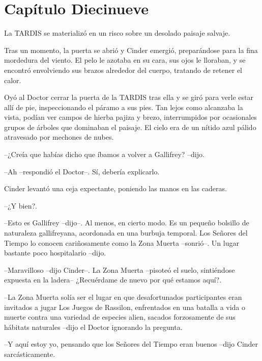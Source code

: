 \chapter*{Capítulo Diecinueve}




La TARDIS se materializó en un risco sobre un desolado paisaje salvaje.

Tras un momento, la puerta se abrió y Cinder emergió, preparándose para la fina mordedura del viento. El pelo le azotaba en su cara, sus ojos le lloraban, y se encontró envolviendo sus brazos alrededor del cuerpo, tratando de retener el calor.

Oyó al Doctor cerrar la puerta de la TARDIS tras ella y se giró para verle estar allí de pie, inspeccionando el páramo a sus pies. Tan lejos como alcanzaba la vista, podían ver campos de hierba pajiza y brezo, interrumpidos por ocasionales grupos de árboles que dominaban el paisaje. El cielo era de un nítido azul pálido atravesado por mechones de nubes.



--¿Creía que habías dicho que íbamos a volver a Gallifrey? --dijo.

--Ah --respondió el Doctor--. Sí, debería explicarlo.



Cinder levantó una ceja expectante, poniendo las manos en las caderas. 



--¿Y bien?.

--Esto es Gallifrey --dijo--. Al menos, en cierto modo. Es un pequeño bolsillo de naturaleza gallifreyana, acordonada en una burbuja temporal. Los Señores del Tiempo lo conocen cariñosamente como la Zona Muerta --sonrió--. Un lugar bastante poco hospitalario --dijo.

--Maravilloso --dijo Cinder--. La Zona Muerta --pisoteó el suelo, sintiéndose expuesta en la ladera-- ¿Recuérdame de nuevo por qué estamos aquí?.

--La Zona Muerta solía ser el lugar en que desafortunados participantes eran invitados a jugar Los Juegos de Rassilon, enfrentados en una batalla a vida o muerte contra una variedad de especies alien, sacados forzosamente de sus hábitats naturales --dijo el Doctor ignorando la pregunta.

--Y aquí estoy yo, pensando que los Señores del Tiempo eran buenos --dijo Cinder sarcásticamente.

